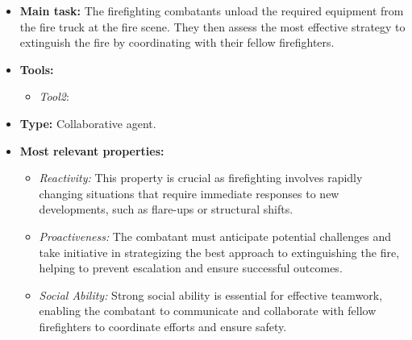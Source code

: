 \begin{itemize}
    \item \textbf{Main task:} The firefighting combatants unload the required equipment from the fire truck at the fire scene. They then assess the most effective strategy to extinguish the fire by coordinating with their fellow firefighters.
    \item \textbf{Tools:}
    \begin{itemize}
        \item \textit{Tool2}:
    \end{itemize}
    \item \textbf{Type:} Collaborative agent.
    \item \textbf{Most relevant properties:}
    \begin{itemize}
        \item \textit{Reactivity:} This property is crucial as firefighting involves rapidly changing situations that require immediate responses to new developments, such as flare-ups or structural shifts.
        \item \textit{Proactiveness:} The combatant must anticipate potential challenges and take initiative in strategizing the best approach to extinguishing the fire, helping to prevent escalation and ensure successful outcomes.
        \item \textit{Social Ability:} Strong social ability is essential for effective teamwork, enabling the combatant to communicate and collaborate with fellow firefighters to coordinate efforts and ensure safety.
    \end{itemize}
\end{itemize}
